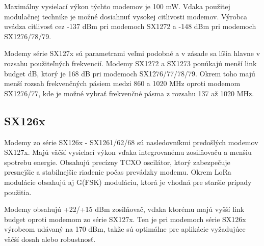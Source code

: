 \documentclass[slovak,master]{diploma}
\begin{document}
Maximálny vysielací výkon týchto modemov je 100 mW.
Vďaka použitej modulačnej technike je možné dosiahnuť vysokej citlivosti modemov.
Výrobca uvádza citlivosť cez -137 dBm pri modemoch SX1272 a -148 dBm pri modemoch SX1276/78/79. 

Modemy série SX127x sú parametrami veľmi podobné a v zásade sa líšia hlavne v rozsahu použiteľných frekvencií.
Modemy SX1272 a SX1273 ponúkajú menší link budget dB, ktorý je 168 dB 
pri modemoch SX1276/77/78/79. 
Okrem toho majú menší rozsah frekvenčných pásiem medzi 860 a 1020 MHz oproti modemom SX1276/77, kde 
je možné vybrať frekvenčné pásma z rozsahu 137 až 1020 MHz.

\subsection{SX126x}

Modemy zo série SX126x - SX1261/62/68 sú nasledovníkmi predošlých modemov SX127x. Majú väčší vysielací výkon vďaka integrovanému zosilňovaču a menšiu spotrebu energie. 
Obsahujú precízny TCXO oscilátor, ktorý zabezpečuje presnejšie a stabilnejšie riadenie počas prevádzky modemu. Okrem LoRa modulácie obsahujú aj G(FSK) moduláciu, ktorá je vhodná pre staršie 
prípady použitia.

Modemy obsahujú +22/+15 dBm zosilňovač, vďaka ktorému majú vyšší link budget oproti modemom zo série SX127x. 
Ten je pri modemoch série SX126x výrobcom udávaný na 170 dBm, takže sú optimálne pre aplikácie vyžadujúce väčší dosah alebo robustnosť.
\end{document}
